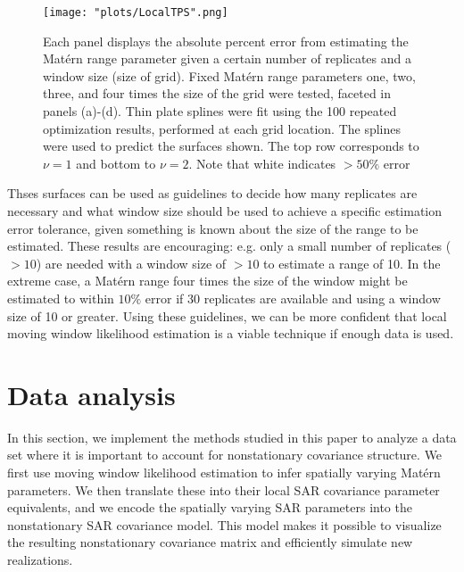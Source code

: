 \documentclass[review]{elsarticle}
\begin{document}
\begin{figure}[h]
    \centering
   \texttt{[image: "plots/LocalTPS".png]}
    \caption{Each panel displays the absolute percent error from estimating the Mat\'ern range parameter given a certain number of replicates and a window size (size of grid). Fixed Mat\'ern range parameters one, two, three, and four times the size of the grid were tested, faceted in panels (a)-(d). Thin plate splines were fit using the 100 repeated optimization results, performed at each grid location. The splines were used to predict the surfaces shown. The top row corresponds to $\nu=1$ and bottom to $\nu=2$. Note that white indicates $>50\%$ error}
    \label{f:2}
\end{figure}

Thses surfaces can be used as guidelines to decide how many replicates are necessary and what window size should be used to achieve a specific estimation error tolerance, given something is known about the size of the range to be estimated. These results are encouraging: e.g. only a small number of replicates ($>10$) are needed with a window size of $>10$ to estimate a range of 10. In the extreme case, a Mat\'ern range four times the size of the window might be estimated to within $10\%$ error if 30 replicates are available and using a window size of 10 or greater. Using these guidelines, we can be more confident that local moving window likelihood estimation is a viable technique if enough data is used.















\section{Data analysis}

In this section, we implement the methods studied in this paper to analyze a data set where it is important to account for nonstationary covariance structure. We first use moving window likelihood estimation to infer spatially varying Mat\'ern parameters. We then translate these into their local SAR covariance parameter equivalents, and we encode the spatially varying SAR parameters into the nonstationary SAR covariance model. This model makes it possible to visualize the resulting nonstationary covariance matrix and efficiently simulate new realizations.
\end{document}
